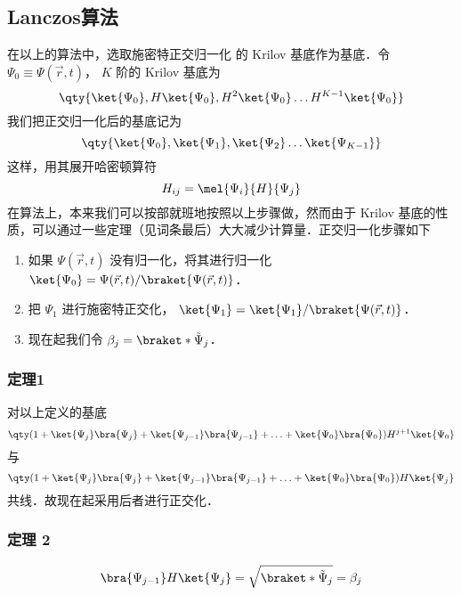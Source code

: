\subsection{Lanczos算法}
在以上的算法中，选取施密特正交归一化 %
的 Krilov 基底作为基底．令 $\Psi_0 \equiv \Psi(\vec r, t)$，  $K$ 阶的 Krilov 基底为
 \begin{equation}
\qty{ \ket{\Psi_0}, H \ket{\Psi_0}, H^2 \ket{\Psi_0} \dots H^{K-1} \ket{\Psi_0}}
\end{equation}
我们把正交归一化后的基底记为
\begin{equation}
\qty{ \ket{\Psi_0}, \ket{\Psi_1}, \ket{\Psi_2} \dots \ket{\Psi_{K-1}} }
\end{equation}
这样，用其展开哈密顿算符
\begin{equation}
H_{ij}=\mel{\Psi_i}{H}{\Psi_j}
\end{equation}
在算法上，本来我们可以按部就班地按照以上步骤做，然而由于 Krilov 基底的性质，可以通过一些定理（见词条最后）大大减少计算量．正交归一化步骤如下

\begin{enumerate}
\item 如果 $\Psi(\vec r,t)$ 没有归一化，将其进行归一化 $\ket{\Psi_0}=\Psi(\vec r,t)/\braket{\Psi(\vec r,t)}$．
\item 把 $\Psi_1$ 进行施密特正交化， $\ket{\Psi_1}=\ket{\Psi_1}/\braket{\Psi(\vec r,t)}$．  %
\item 现在起我们令 $\beta_j = \braket*{\tilde\Psi_j}$． %
\end{enumerate}

\subsubsection{定理1}
对以上定义的基底
\begin{equation}
\qty(1 + \ket{\Psi_j} \bra{\Psi_j} + \ket{\Psi_{j - 1}} \bra{\Psi_{j - 1}} + \ldots + \ket{\Psi_0} \bra{\Psi_0}) H^{j + 1} \ket{\Psi_0}
\end{equation}
与
\begin{equation}
\qty( 1 + \ket{\Psi_j}\bra{\Psi_j} + \ket{\Psi_{j - 1}}\bra{\Psi_{j - 1}} + \ldots + \ket{\Psi_0}\bra{\Psi_0}) H \ket{\Psi_j}
\end{equation}
共线．故现在起采用后者进行正交化．

\subsubsection{定理 2}
\begin{equation}
\bra{\Psi_{j-1}} H \ket{\Psi_j}  = \sqrt{\braket*{\tilde\Psi_j}} = \beta_j
\end{equation}

